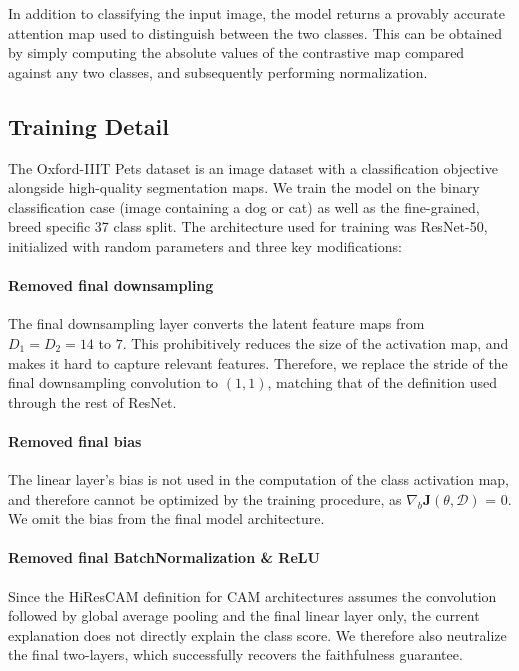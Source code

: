 \documentclass{article}
\begin{document}
In addition to classifying the input image, the model returns a provably accurate attention map used to distinguish between the two classes. This can be obtained by simply computing the absolute values of the contrastive map compared against any two classes, and subsequently performing normalization.

\subsection{Training Detail}

The Oxford-IIIT Pets dataset is an image dataset with a classification objective alongside high-quality segmentation maps. We train the model on the binary classification case (image containing a dog or cat) as well as the fine-grained, breed specific 37 class split. The architecture used for training was ResNet-50, initialized with random parameters and three key modifications:

\paragraph{Removed final downsampling} The final downsampling layer converts the latent feature maps from $D_1 = D_2 = 14$ to $7$. This prohibitively reduces the size of the activation map, and makes it hard to capture relevant features. Therefore, we replace the stride of the final downsampling convolution to $(1,1)$, matching that of the definition used through the rest of ResNet. 

\paragraph{Removed final bias} The linear layer's bias is not used in the computation of the class activation map, and therefore cannot be optimized by the training procedure, as $\nabla_b \mathcal{\bm{J}}(\theta, \mathcal{D})$ = 0. We omit the bias from the final model architecture.

\paragraph{Removed final BatchNormalization \& ReLU} Since the HiResCAM definition for CAM architectures assumes the convolution followed by global average pooling and the final linear layer only, the current explanation does not directly explain the class score. We therefore also neutralize the final two-layers, which successfully recovers the faithfulness guarantee.
\end{document}
